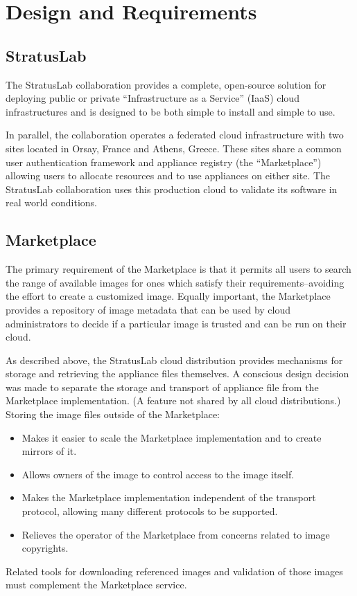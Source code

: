 \section{Design and Requirements}
\label{sec:design}

\subsection{StratusLab}

The StratusLab collaboration provides a complete, open-source solution
for deploying public or private ``Infrastructure as a Service'' (IaaS)
cloud infrastructures and is designed to be both simple to install and
simple to use.~\cite{slbook}

In parallel, the collaboration operates a federated cloud
infrastructure with two sites located in Orsay, France and Athens,
Greece\@.  These sites share a common user authentication framework
and appliance registry (the ``Marketplace'') allowing users to
allocate resources and to use appliances on either site.  The
StratusLab collaboration uses this production cloud to validate its
software in real world conditions.

\subsection{Marketplace}

The primary requirement of the Marketplace is that it permits all
users to search the range of available images for ones which satisfy
their requirements--avoiding the effort to create a customized image.
Equally important, the Marketplace provides a repository of image
metadata that can be used by cloud administrators to decide if a
particular image is trusted and can be run on their cloud.

As described above, the StratusLab cloud distribution provides
mechanisms for storage and retrieving the appliance files themselves.
A conscious design decision was made to separate the storage and
transport of appliance file from the Marketplace implementation.  (A
feature not shared by all cloud distributions.)  Storing the image
files outside of the Marketplace:
\begin{itemize}
\item Makes it easier to scale the Marketplace implementation and to
  create mirrors of it.
\item Allows owners of the image to control access to the image
  itself.
\item Makes the Marketplace implementation independent of the
  transport protocol, allowing many different protocols to be
  supported.
\item Relieves the operator of the Marketplace from concerns related
  to image copyrights.
\end{itemize}
Related tools for downloading referenced images and validation of
those images must complement the Marketplace service.

